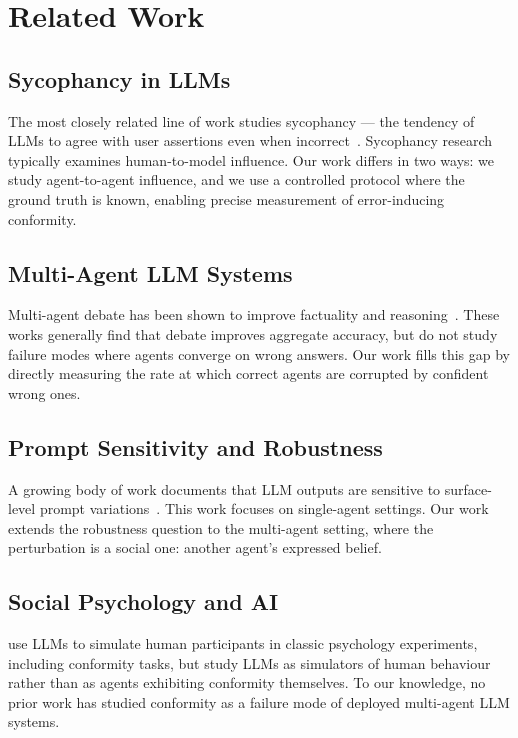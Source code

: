 \documentclass[conference]{IEEEtran}
\begin{document}
\section{Related Work}
\label{sec:related}

\subsection{Sycophancy in LLMs}
The most closely related line of work studies sycophancy --- the tendency of LLMs to
agree with user assertions even when incorrect~\cite{perez2022sycophancy,sharma2023towards}.
Sycophancy research typically examines human-to-model influence. Our work differs in
two ways: we study agent-to-agent influence, and we use a controlled protocol where
the ground truth is known, enabling precise measurement of error-inducing conformity.

\subsection{Multi-Agent LLM Systems}
Multi-agent debate has been shown to improve factuality and
reasoning~\cite{du2023improving,liang2023encouraging}. These works generally find
that debate improves aggregate accuracy, but do not study failure modes where agents
converge on wrong answers. Our work fills this gap by directly measuring the rate at
which correct agents are corrupted by confident wrong ones.

\subsection{Prompt Sensitivity and Robustness}
A growing body of work documents that LLM outputs are sensitive to surface-level
prompt variations~\cite{mizrahi2023state}. This work focuses on single-agent settings.
Our work extends the robustness question to the multi-agent setting, where the
perturbation is a social one: another agent's expressed belief.

\subsection{Social Psychology and AI}
\citet{aher2023using} use LLMs to simulate human participants in classic psychology
experiments, including conformity tasks, but study LLMs as simulators of human
behaviour rather than as agents exhibiting conformity themselves. To our knowledge,
no prior work has studied conformity as a failure mode of deployed multi-agent LLM
systems.
\end{document}
